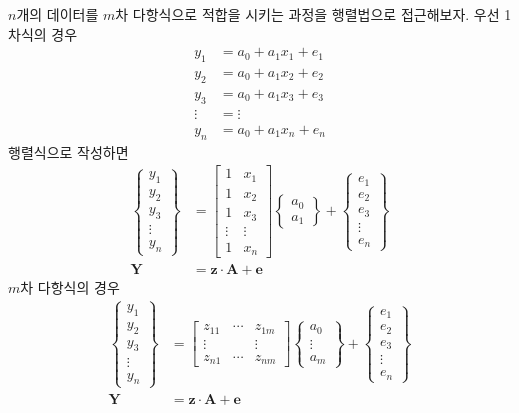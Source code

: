 $n$개의 데이터를 $m$차 다항식으로 적합을 시키는 과정을 행렬법으로 접근해보자. 우선 1차식의 경우
\begin{align*}
y_{1}&=a_{0}+a_{1}x_{1}+e_{1}\\
y_{2}&=a_{0}+a_{1}x_{2}+e_{2}\\
y_{3}&=a_{0}+a_{1}x_{3}+e_{3}\\
\vdots&=\vdots\\
y_{n}&=a_{0}+a_{1}x_{n}+e_{n}
\end{align*}
행렬식으로 작성하면
\begin{align}
\begin{Bmatrix}y_{1}\\y_{2}\\y_{3}\\\vdots\\y_{n}\end{Bmatrix}&=\begin{bmatrix}1&x_{1}\\1&x_{2}\\1&x_{3}\\\vdots&\vdots\\1&x_{n}\end{bmatrix}\begin{Bmatrix}a_{0}\\a_{1}\end{Bmatrix}+\begin{Bmatrix}e_{1}\\e_{2}\\e_{3}\\\vdots\\e_{n}\end{Bmatrix}\\
\mathbf{Y}&=\mathbf{z}\cdot\mathbf{A}+\mathbf{e}
\end{align}
$m$차 다항식의 경우
\begin{align}
\begin{Bmatrix}y_{1}\\y_{2}\\y_{3}\\\vdots\\y_{n}\end{Bmatrix}&=\begin{bmatrix}z_{11}&\cdots&z_{1m}\\\vdots&&\vdots\\z_{n1}&\cdots&z_{nm}\end{bmatrix}\begin{Bmatrix}a_{0}\\\vdots\\a_{m}\end{Bmatrix}+\begin{Bmatrix}e_{1}\\e_{2}\\e_{3}\\\vdots\\e_{n}\end{Bmatrix}\\
\mathbf{Y}&=\mathbf{z}\cdot\mathbf{A}+\mathbf{e}
\end{align}
